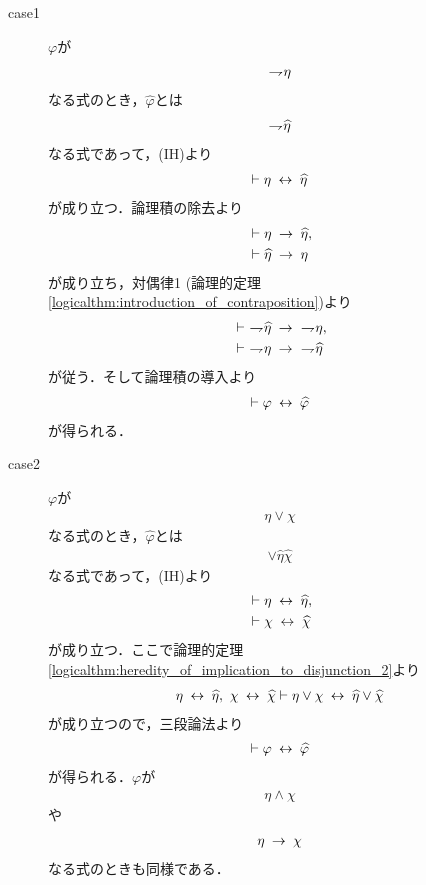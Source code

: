 \begin{sketch}
\begin{description}
			\begin{description}
				\item[case1] $\varphi$が
					\begin{align}
						\rightharpoondown\hspace{-0.25em} \eta
					\end{align}
					なる式のとき，$\widehat{\varphi}$とは
					\begin{align}
						\rightharpoondown\hspace{-0.25em} \widehat{\eta}
					\end{align}
					なる式であって，(IH)より
					\begin{align}
						\vdash \eta \hspace{0.25em}\leftrightarrow\hspace{0.25em} \widehat{\eta}
					\end{align}
					が成り立つ．論理積の除去より
					\begin{align}
						&\vdash \eta \hspace{0.25em}\rightarrow\hspace{0.25em} \widehat{\eta}, \\
						&\vdash \widehat{\eta} \hspace{0.25em}\rightarrow\hspace{0.25em} \eta
					\end{align}
					が成り立ち，対偶律1 (論理的定理\ref{logicalthm:introduction_of_contraposition})より
					\begin{align}
						&\vdash\ \negation \widehat{\eta} \rarrow\ \negation \eta, \\
						&\vdash\ \negation \eta \rarrow\ \negation \widehat{\eta}
					\end{align}
					が従う．そして論理積の導入より
					\begin{align}
						\vdash \varphi \hspace{0.25em}\leftrightarrow\hspace{0.25em} \widehat{\varphi}
					\end{align}
					が得られる．
					
				\item[case2] 
					$\varphi$が
					\begin{align}
						\eta \vee \chi
					\end{align}
					なる式のとき，$\widehat{\varphi}$とは
					\begin{align}
						\vee \widehat{\eta} \widehat{\chi}
					\end{align}
					なる式であって，(IH)より
					\begin{align}
						&\vdash \eta \hspace{0.25em}\leftrightarrow\hspace{0.25em} \widehat{\eta}, \\
						&\vdash \chi \hspace{0.25em}\leftrightarrow\hspace{0.25em} \widehat{\chi}
					\end{align}
					が成り立つ．ここで論理的定理\ref{logicalthm:heredity_of_implication_to_disjunction_2}より
					\begin{align}
						\eta \hspace{0.25em}\leftrightarrow\hspace{0.25em} \widehat{\eta},\ \chi \hspace{0.25em}\leftrightarrow\hspace{0.25em} \widehat{\chi} \vdash 
						\eta \vee \chi \hspace{0.25em}\leftrightarrow\hspace{0.25em} \widehat{\eta} \vee \widehat{\chi}
					\end{align}
					が成り立つので，三段論法より
					\begin{align}
						\vdash \varphi \hspace{0.25em}\leftrightarrow\hspace{0.25em} \widehat{\varphi}
					\end{align}
					が得られる．$\varphi$が
					\begin{align}
						\eta \wedge \chi
					\end{align}
					や
					\begin{align}
						\eta \hspace{0.25em}\rightarrow\hspace{0.25em} \chi
					\end{align}
					なる式のときも同様である．
					

\end{description}
\end{description}
\end{sketch}
